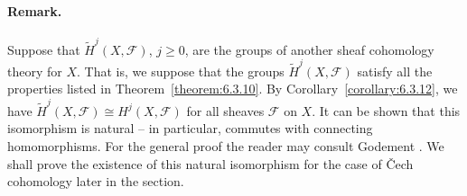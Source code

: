 \paragraph{Remark.} Suppose that $\widetilde H^j(X,\mathcal F)$, $j\geq0$, are the groups of another sheaf cohomology theory for $X$. That is, we suppose that the groups $\widetilde H^j(X,\mathcal F)$ satisfy all the properties listed in Theorem~\ref{theorem:6.3.10}. By Corollary~\ref{corollary:6.3.12}, we have $\widetilde H^j(X,\mathcal F)\cong H^j(X,\mathcal F)$ for all sheaves $\mathcal F$ on $X$. It can be shown that this isomorphism is natural -- in particular, commutes with connecting homomorphisms. For the general proof the reader may consult Godement \cite{bib:II:godement-r:1}. We shall prove the existence of this natural isomorphism for the case of \v{C}ech cohomology later in the section.
